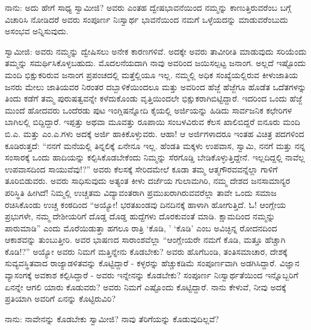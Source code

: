 ನಾನು: ಅದು ಹೇಗೆ ಸಾಧ್ಯ ಸ್ವಾಮೀಜಿ? ಅವರು ಎಂತಹ ದ್ವೇಷಭಾವನೆಯಿಂದ ನಮ್ಮನ್ನು ಕಾಣುತ್ತಿರುವರೆಂಬ ಬಗ್ಗೆ ವಿಚಾರಿಸಿ ನೋಡಿದರೆ ಅವರು ಸಂಪೂರ್ಣ ನಿಃಸ್ವಾರ್ಥ ಭಾವನೆಯಿಂದ ನಮಗೆ ಒಳ್ಳೆಯದನ್ನು ಮಾಡುವರೆಂಬುದು ಅಸಂಭವ ಅನ್ನಿಸುವುದು.

ಸ್ವಾಮೀಜಿ: ಅವರು ನಮ್ಮನ್ನು ದ್ವೇಷಿಸಲು ಅನೇಕ ಕಾರಣಗಳಿವೆ. ಅದಕ್ಕೇ ಅವರು ತಾವೀರೀತಿ ಮಾಡುವುದು ಸರಿಯೆಂದು ತಮ್ಮನ್ನು ಸಮರ್ಥಿಸಿಕೊಳ್ಳಬಹುದು. ಮೊದಲನೆಯದಾಗಿ ನಾವು ಅವರಿಂದ ಜಯಿಸಲ್ಪಟ್ಟ ಜನಾಂಗ. ಅಲ್ಲದೆ ಇಷ್ಟೊಂದು ಮಂದಿ ಭಿಕ್ಷುಕರಿರುವ ಜನಾಂಗ ಪ್ರಪಂಚದಲ್ಲಿ ಮತ್ತೆಲ್ಲಿಯೂ ಇಲ್ಲ. ನಮ್ಮಲ್ಲಿ ಅಧಿಕ ಸಂಖ್ಯೆಯಲ್ಲಿರುವ ಕೀಳುಜಾತಿಯ ಜನರು ಮೇಲು ಜಾತಿಯವರ ನಿರಂತರ ದಬ್ಬಾಳಿಕೆಯಿಂದಲೂ ಮತ್ತು ಅವರಿಂದ ಹೆಜ್ಜೆ ಹೆಜ್ಜೆಗೂ ಹೊಡೆತ ಒದೆತಗಳನ್ನು ತಿಂದು ಕಡೆಗೆ ತಮ್ಮ ಪುರುಷತ್ವವನ್ನೇ ಕಳೆದುಕೊಂಡು ವೃತ್ತಿಯಿಂದಲೇ ಭಿಕ್ಷುಕರಾಗಿಬಿಟ್ಟಿದ್ದಾರೆ. ಇದರಿಂದ ಒಂದು ಹೆಜ್ಜೆ ಮುಂದೆ ಹೋದವರು ಒಂದೆರಡು ಪುಟ ಇಂಗ್ಲಿಷನ್ನೋದಿ ಕೈಯಲ್ಲಿ ಅರ್ಜಿಯನ್ನು ಹಿಡಿದು ಸಾರ್ವಜನಿಕ ಕಛೇರಿಗಳ ಬಾಗಿಲಲ್ಲಿ ಬಿದ್ದಿದ್ದಾರೆ. ಇಪ್ಪತ್ತು ಅಥವಾ ಮೂವತ್ತು ರೂಪಾಯಿ ಸಂಬಳವಿರುವ ಕೆಲಸ ಖಾಲಿಬಿದ್ದರೆ ಐನೂರು ಮಂದಿ ಬಿ.ಎ. ಮತ್ತು ಎಂ.ಎ.ಗಳು ಅದಕ್ಕೆ ಅರ್ಜಿ ಹಾಕಿಕೊಳ್ಳುವರು. ಆಹಾ! ಆ ಅರ್ಜಿಗಳಾದರೂ ಇಂತಹ ವಿಚಿತ್ರ ಪದಗಳಿಂದ ಕೂಡಿರುತ್ತದೆ: “ನನಗೆ ಮನೆಯಲ್ಲಿ ತಿನ್ನಲಿಕ್ಕೆ ಏನೇನೂ ಇಲ್ಲ. ಹೆಂಡತಿ ಮಕ್ಕಳು ಉಪವಾಸ, ಸ್ವಾಮಿ, ನನಗೆ ಮತ್ತು ನನ್ನ ಸಂಸಾರಕ್ಕೆ ಒಂದು ಹಾದಿಯನ್ನು ಕಲ್ಪಿಸಿಕೊಡಬೇಕೆಂದು ನಿಮ್ಮನ್ನು ಸೆರಗೊಡ್ಡಿ ಬೇಡಿಕೊಳ್ಳುತ್ತಿದ್ದೇನೆ. ಇಲ್ಲದಿದ್ದಲ್ಲಿ ನಾವೆಲ್ಲ ಉಪವಾಸದಿಂದ ಸಾಯುವೆವು!?” ಅವರು ಕೆಲಸಕ್ಕೆ ಸೇರಿದಮೇಲೆ ಕೂಡಾ ತಮ್ಮ ಆತ್ಮಗೌರವವನ್ನೆಲ್ಲಾ ಗಾಳಿಗೆ ತೂರಿಬಿಡುವರು. ಅವರು ಸಾಧಿಸುವುದು ಅತ್ಯಂತ ಕೀಳು ದರ್ಜೆಯ ಗುಲಾಮಗಿರಿ, ನಮ್ಮ ದೇಶದ ಜನಸಾಮಾನ್ಯರ ಪರಿಸ್ಥಿತಿ ಹೀಗಿದೆ! ನಿಮ್ಮಲ್ಲಿ ಉಚ್ಚತಮ ವಿದ್ಯಾವಂತರಾಗಿ ಪ್ರಮುಖರಾಗಿರುವವರೆಲ್ಲಾ ತಾವೇ ಒಂದು ಸಮಾಜ ರಚಿಸಿಕೊಂಡು ಉಚ್ಚ ಕಂಠದಿಂದ “ಅಯ್ಯೋ! ಭರತಖಂಡವು ದಿನದಿನಕ್ಕೆ ಹಾಳಾಗಿ ಹೋಗುತ್ತಿದೆ. ಓ! ಆಂಗ್ಲೇಯ ಪ್ರಭುಗಳೇ, ನಮ್ಮ ದೇಶೀಯರಿಗೆ ದೊಡ್ಡ ದೊಡ್ಡ ಹುದ್ದೆಗಳು ದೊರಕುವಂತೆ ಮಾಡಿ. ಕ್ಷಾಮದಿಂದ ನಮ್ಮನ್ನು ಪಾರುಮಾಡಿ” ಎಂದು ಮೊರೆಯಿಡುತ್ತಾ ಹಗಲೂ ರಾತ್ರಿ ‘ಕೊಡಿ, ’ ‘ಕೊಡಿ’ ಎಂಬ ಅವಿಚ್ಛಿನ್ನ ರೋದನದಿಂದ ಆಕಾಶವನ್ನು ತುಂಬುತ್ತೀರಿ. ಅವರ ಭಾಷಣದ ಸಾರಾಂಶವೆಲ್ಲಾ “ಆಂಗ್ಲೇಯರೇ ನಮಗೆ ಕೊಡಿ, ಮತ್ತೂ ಹೆಚ್ಚಾಗಿ ಕೊಡಿ!?” ಅಯ್ಯೋ ಅವರು ನಿಮಗೆ ಮತ್ತಿನ್ನೇನು ಕೊಡಬೇಕು? ಅವರು ಹೊಗೆಬಂಡಿ, ತಂತಿಸಮಾಚಾರ, ದೇಶಕ್ಕೆ ಸುವ್ಯವಸ್ಥಿತವಾದ ರಾಜ್ಯಾಡಳಿತವನ್ನು ಕೊಟ್ಟಿದ್ದಾರೆ - ಕಳ್ಳರನ್ನು ಹೆಚ್ಚುಕಡಿಮೆ ಸಂಪೂರ್ಣವಾಗಿ ಅಡಗಿಸಿದ್ದಾರೆ. ವಿಜ್ಞಾನ ವ್ಯಾಸಂಗಕ್ಕೆ ಅವಕಾಶ ಕಲ್ಪಿಸಿದ್ದಾರೆ - ಅವರು ಇನ್ನೇನನ್ನು ಕೊಡಬೇಕು? ಸಂಪೂರ್ಣ ನಿಃಸ್ವಾರ್ಥತೆಯಿಂದ ಇನ್ನೊಬ್ಬರಿಗೆ ಏನನ್ನೇ ಆಗಲಿ ಯಾರು ಕೊಡುವರು? ಅವರು ನಿಮಗೆ ಎಷ್ಟೊಂದು ಕೊಟ್ಟಿದ್ದಾರೆ. ನಾನು ಕೇಳುವೆ, ನೀವು ಅದಕ್ಕೆ ಪ್ರತಿಯಾಗಿ ಅವರಿಗೆ ಏನನ್ನು ಕೊಟ್ಟಿರುವಿರಿ?

ನಾನು: ನಾವೇನನ್ನು ಕೊಡಬೇಕು ಸ್ವಾಮೀಜಿ? ನಾವು ತೆರಿಗೆಯನ್ನು ಕೊಡುವುದಿಲ್ಲವೆ?

